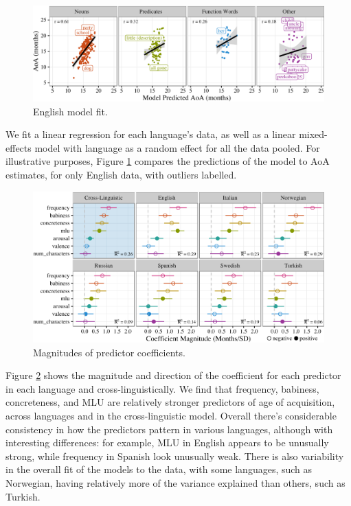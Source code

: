 \documentclass[10pt, letterpaper]{article}
\newenvironment{CodeChunk}{}{}
\begin{document}
\begin{CodeChunk}
\begin{figure}[tb]

{\centering \includegraphics{figs/fit-1} 

}

\caption[English model fit]{English model fit.}\label{fig:fit}
\end{figure}
\end{CodeChunk}

We fit a linear regression for each language's data, as well as a linear
mixed-effects model with language as a random effect for all the data
pooled. For illustrative purposes, Figure \ref{fig:fit} compares the
predictions of the model to AoA estimates, for only English data, with
outliers labelled.

\begin{CodeChunk}
\begin{figure}[tb]

{\centering \includegraphics{figs/coefs-1} 

}

\caption[Magnitudes of predictor coefficients]{Magnitudes of predictor coefficients.}\label{fig:coefs}
\end{figure}
\end{CodeChunk}

Figure \ref{fig:coefs} shows the magnitude and direction of the
coefficient for each predictor in each language and
cross-linguistically. We find that frequency, babiness, concreteness,
and MLU are relatively stronger predictors of age of acquisition, across
languages and in the cross-linguistic model. Overall there's
considerable consistency in how the predictors pattern in various
languages, although with interesting differences: for example, MLU in
English appears to be unusually strong, while frequency in Spanish look
unusually weak. There is also variability in the overall fit of the
models to the data, with some languages, such as Norwegian, having
relatively more of the variance explained than others, such as Turkish.
\end{document}
